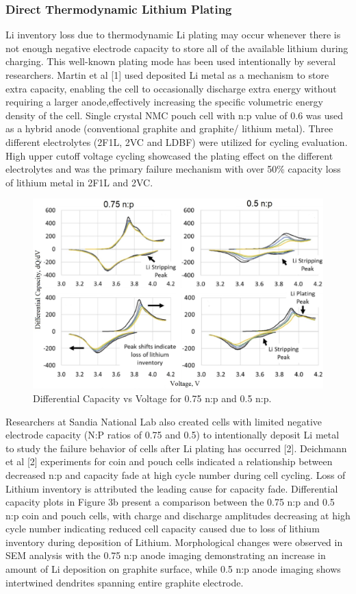 \documentclass{article}
\begin{document}
\subsubsection{Direct Thermodynamic Lithium Plating}
Li inventory loss due to thermodynamic Li plating may occur whenever there is not enough negative electrode capacity to store all of the available lithium during charging.  This well-known plating mode has been used intentionally by several researchers.  Martin et al [1] used deposited Li metal as a mechanism to store extra capacity, enabling the cell to occasionally discharge extra energy without requiring a larger anode,effectively increasing the specific volumetric energy density of the cell. Single crystal NMC pouch cell with n:p value of 0.6 was used as a hybrid anode (conventional graphite and graphite/ lithium metal). Three different electrolytes (2F1L, 2VC and LDBF) were utilized for cycling evaluation. High upper cutoff voltage cycling showcased the plating effect on the different electrolytes and was the primary failure mechanism with over 50\% capacity loss of lithium metal in 2F1L and 2VC.  
\begin{figure}
\centering
\includegraphics[scale = 0.4]{images/Differential Capacity vs Voltage.jpg}
\caption{Differential Capacity vs Voltage for 0.75 n:p and 0.5 n:p.}
\label{fig:knee_definition}
\end{figure}
Researchers at Sandia National Lab also created cells with limited negative electrode capacity (N:P ratios of 0.75 and 0.5) to intentionally deposit Li metal to study the failure behavior of cells after Li plating has occurred [2]. Deichmann et al [2] experiments for coin and pouch cells indicated a relationship between decreased n:p and capacity fade at high cycle number during cell cycling. Loss of Lithium inventory is attributed the leading cause for capacity fade. Differential capacity plots in Figure 3b present a comparison between the 0.75 n:p and 0.5 n:p coin and pouch cells, with charge and discharge amplitudes decreasing at high cycle number indicating reduced cell capacity caused due to loss of lithium inventory during deposition of Lithium. Morphological changes were observed in SEM analysis with the 0.75 n:p anode imaging demonstrating an increase in amount of Li deposition on graphite surface, while 0.5 n:p anode imaging shows intertwined dendrites spanning entire graphite electrode. 
\end{document}
